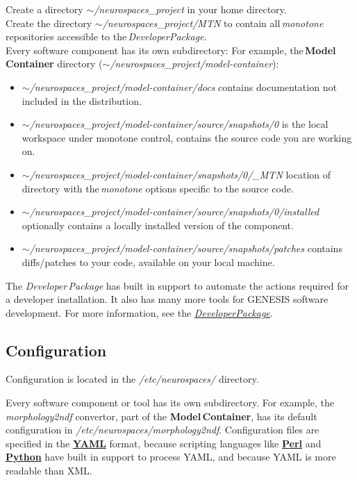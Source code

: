 \documentclass[12pt]{article}
\begin{document}
Create a directory {\it $\sim$/neurospaces\_project} in your home directory. \\
\noindent Create the directory {\it $\sim$/neurospaces\_project/MTN} to contain all\,{\it monotone} repositories accessible to the\,{\it DeveloperPackage}. \\
\noindent Every software component has its own subdirectory: For example, the\,{\bf Model\,Container} directory ({\it $\sim$/neurospaces\_project/model-container}):

\begin{itemize}
\item[]{\it $\sim$/neurospaces\_project/model-container/docs} contains documentation not included in the distribution. 
\item[]{\it $\sim$/neurospaces\_project/model-container/source/snapshots/0} is the local workspace under monotone control, contains the source code you are working on. 
\item[]{\it $\sim$/neurospaces\_project/model-container/snapshots/0/\_MTN} location of directory with the\,{\it monotone} options specific to the source code.
\item[]{\it $\sim$/neurospaces\_project/model-container/source/snapshots/0/installed} optionally contains a locally installed version of the component.
\item[]{\it $\sim$/neurospaces\_project/model-container/source/snapshots/patches} contains diffs/patches to your code, available on your local machine.
\end{itemize}
The {\it Developer\,Package} has built in support to automate the actions required for a developer installation. It also has many more tools for GENESIS software development. For more information, see the \href{../developer-package/developer-package.tex}{\it DeveloperPackage}.

\subsection*{Configuration}

Configuration is located in the {\it /etc/neurospaces/} directory.

Every software component or tool has its own subdirectory. For example, the {\it morphology2ndf} convertor, part of the {\bf Model\,Container}, has its default configuration in {\it /etc/neurospaces/morphology2ndf}. Configuration files are specified in the \href{http://www.yaml.org/}{\bf YAML} format, because scripting languages like \href{http://www.perl.org/}{\bf Perl} and \href{http://www.python.org/}{\bf Python} have built in support to process YAML, and because YAML is more readable than XML.
\end{document}
